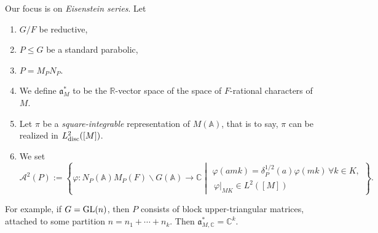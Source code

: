 \documentclass[reqno]{amsart} 
\begin{document}
Our focus is on \emph{Eisenstein series}.  Let
\begin{enumerate}
\item $G/F$ be reductive, 
\item $P \leq G$ be a standard parabolic,
\item $P = M_P N_P$.
\item We define $\mathfrak{a}_M^\ast$ to be the $\mathbb{R}$-vector space of the space of $F$-rational characters of $M$.
\item Let $\pi$ be a \emph{square-integrable} representation of $M (\mathbb{A})$, that is to say, $\pi$ can be realized in $L^2_{\operatorname{disc}} ([M])$.
\item We set
  \begin{equation*}
    \mathcal{A}^2 (P) :=
    \left\{ \varphi : N_P (\mathbb{A} ) M_P (F) \backslash G (\mathbb{A} ) \rightarrow \mathbb{C} \middle\vert
      \begin{gathered}
        \varphi (a m k ) = \delta_P^{1/2} (a) \varphi (m k ) \, \forall k \in K, \\
      \,
      \varphi |_{M K} \in L^2 ([M])
      \end{gathered}
    \right\}.
\end{equation*}
\end{enumerate}
For example, if $G = \operatorname{GL}(n)$, then $P$ consists of block upper-triangular matrices, attached to some partition $n = n_1 + \dotsb + n_k$.  Then $\mathfrak{a}_{M, \mathbb{C} }^\ast = \mathbb{C}^k $.
\end{document}
